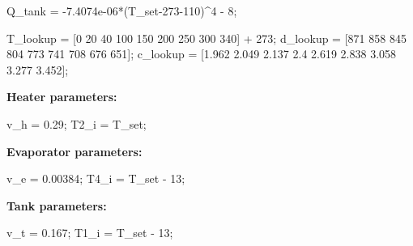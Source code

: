 \label{H_445E186B}

\begin{par}
\hfill \break
\end{par}

\begin{matlabcode}
Q_tank = -7.4074e-06*(T_set-273-110)^4 - 8; %
\end{matlabcode}

\label{H_628676B0}

\begin{par}
\hfill \break
\end{par}

\begin{matlabcode}
T_lookup = [0 20 40 100 150 200 250 300 340] + 273;
d_lookup = [871 858 845 804 773 741 708 676 651];
c_lookup = [1.962 2.049 2.137 2.4 2.619 2.838 3.058 3.277 3.452];
\end{matlabcode}

\begin{par}
\begin{flushleft}
\textbf{Heater parameters:}
\end{flushleft}
\end{par}

\begin{matlabcode}
v_h =       0.29; %
T2_i =     T_set; %
\end{matlabcode}

\begin{par}
\begin{flushleft}
\textbf{Evaporator parameters:}
\end{flushleft}
\end{par}

\begin{matlabcode}
v_e =    0.00384;                %
T4_i =   T_set - 13;             %
\end{matlabcode}

\begin{par}
\begin{flushleft}
\textbf{Tank parameters:}
\end{flushleft}
\end{par}

\begin{matlabcode}
v_t =   0.167;                  %
T1_i =  T_set - 13;             %
\end{matlabcode}

